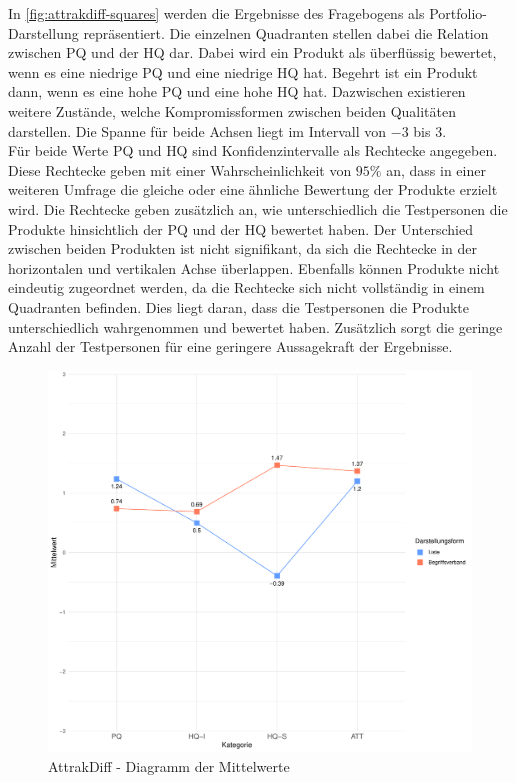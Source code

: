 In \autoref{fig:attrakdiff-squares} werden die Ergebnisse des Fragebogens als Portfolio-Darstellung repräsentiert.
Die einzelnen Quadranten stellen dabei die Relation zwischen \ac{PQ} und der \ac{HQ} dar.
Dabei wird ein Produkt als überflüssig bewertet, wenn es eine niedrige \ac{PQ} und eine niedrige \ac{HQ} hat.
Begehrt ist ein Produkt dann, wenn es eine hohe \ac{PQ} und eine hohe \ac{HQ} hat.
Dazwischen existieren weitere Zustände, welche Kompromissformen zwischen beiden Qualitäten darstellen.
Die Spanne für beide Achsen liegt im Intervall von $-3$ bis $3$. \\

Für beide Werte \ac{PQ} und \ac{HQ} sind Konfidenzintervalle als Rechtecke angegeben.
Diese Rechtecke geben mit einer Wahrscheinlichkeit von $95\%$ an, dass in einer weiteren Umfrage die gleiche oder eine ähnliche Bewertung der Produkte erzielt wird.
Die Rechtecke geben zusätzlich an, wie unterschiedlich die Testpersonen die Produkte hinsichtlich der \ac{PQ} und der \ac{HQ} bewertet haben.
Der Unterschied zwischen beiden Produkten ist nicht signifikant, da sich die Rechtecke in der horizontalen und vertikalen Achse überlappen.
Ebenfalls können Produkte nicht eindeutig zugeordnet werden, da die Rechtecke sich nicht vollständig in einem Quadranten befinden.
Dies liegt daran, dass die Testpersonen die Produkte unterschiedlich wahrgenommen und bewertet haben.
Zusätzlich sorgt die geringe Anzahl der Testpersonen für eine geringere Aussagekraft der Ergebnisse. \\

\begin{figure}[!ht]
    \centering
    \includegraphics[width=0.7\columnwidth]{figures/attrakdiff-line.pdf}
    \caption{\label{fig:attrakdiff-line}AttrakDiff - Diagramm der Mittelwerte}
\end{figure}

